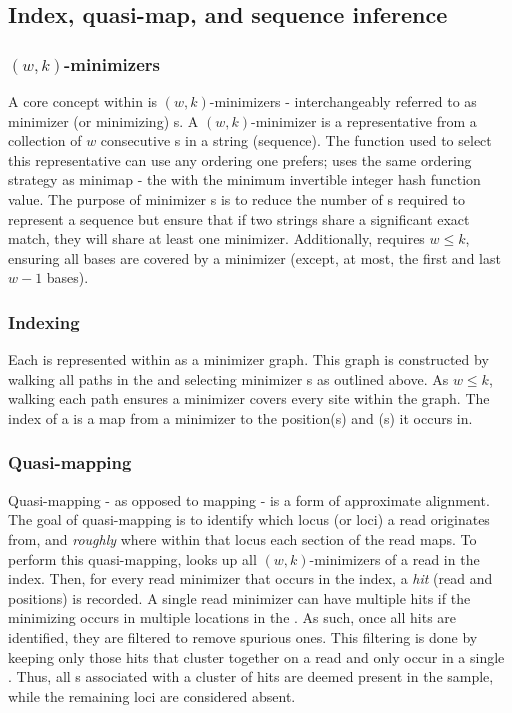 \subsection{Index, quasi-map, and sequence inference}

\subsubsection{$(w,k)$-minimizers}
A core concept within \pandora{} is $(w,k)$-minimizers \cite{Roberts2004} - interchangeably referred to as minimizer (or minimizing) \kmer{}s. A $(w,k)$-minimizer is a representative \kmer{} from a collection of $w$ consecutive \kmer{}s in a string (sequence). The function used to select this representative can use any ordering one prefers; \pandora{} uses the same ordering strategy as minimap \cite{minimap2016} - the \kmer{} with the minimum invertible integer hash function value. The purpose of minimizer \kmer{}s is to reduce the number of \kmer{}s required to represent a sequence but ensure that if two strings share a significant exact match, they will share at least one minimizer. Additionally, \pandora{} requires $w\le k$, ensuring all \prg{} bases are covered by a minimizer (except, at most, the first and last $w-1$ bases).

\subsubsection{Indexing}
Each \prg{} is represented within \pandora{} as a minimizer \kmer{} graph. This graph is constructed by walking all paths in the \prg{} and selecting minimizer \kmer{}s as outlined above. As $w\le k$, walking each path ensures a minimizer covers every site within the graph. The index of a \panrg{} is a map from a minimizer \kmer{} to the position(s) and \prg{}(s) it occurs in. 

\subsubsection{Quasi-mapping}
\label{sec:quasi-map}
Quasi-mapping - as opposed to mapping - is a form of approximate alignment. The goal of quasi-mapping is to identify which locus (or loci) a read originates from, and \emph{roughly} where within that locus each section of the read maps. To perform this quasi-mapping, \pandora{} looks up all $(w,k)$-minimizers of a read in the index. Then, for every read minimizer that occurs in the index, a \emph{hit} (read and \prg{} positions) is recorded. A single read minimizer can have multiple hits if the minimizing \kmer{} occurs in multiple locations in the \panrg{}. As such, once all hits are identified, they are filtered to remove spurious ones. This filtering is done by keeping only those hits that cluster together on a read and only occur in a single \prg{}. Thus, all \prg{}s associated with a cluster of hits are deemed present in the sample, while the remaining loci are considered absent.

